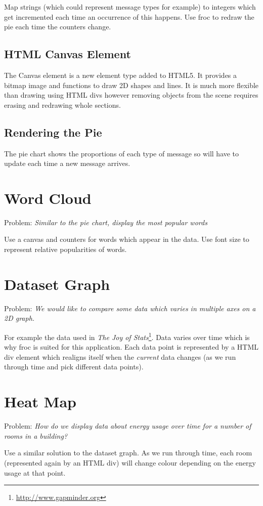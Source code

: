 Map strings (which could represent message types for example) to integers which get incremented each time an occurrence of this happens. Use froc to redraw the pie each time the counters change.

\subsection{HTML Canvas Element}
The Canvas element is a new element type added to HTML5. It provides a bitmap image and functions to draw 2D shapes and lines. It is much more flexible than drawing using HTML divs however removing objects from the scene requires erasing and redrawing whole sections.

\subsection{Rendering the Pie}
The pie chart shows the proportions of each type of message so will have to update each time a new message arrives.

\section{Word Cloud}
Problem: \emph{Similar to the pie chart, display the most popular words}

Use a canvas and counters for words which appear in the data. Use font size to represent relative popularities of words.

\section{Dataset Graph}
Problem: \emph{We would like to compare some data which varies in multiple axes on a 2D graph.}

For example the data used in \emph{The Joy of Stats}\footnote{\url{http://www.gapminder.org}}. Data varies over time which is why froc is suited for this application. Each data point is represented by a HTML div element which realigns itself when the \emph{current} data changes (as we run through time and pick different data points).

\section{Heat Map}
Problem: \emph{How do we display data about energy usage over time for a number of rooms in a building?}

Use a similar solution to the dataset graph. As we run through time, each room (represented again by an HTML div) will change colour depending on the energy usage at that point.
